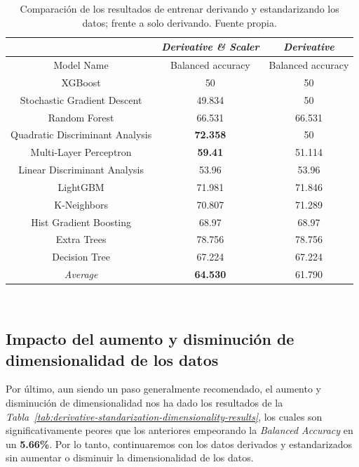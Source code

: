 \begin{table}[!h]
    \centering
    \begin{tabular}{|c|c|c|}
        \hline
        & \textit{Derivative \& Scaler} & \textit{Derivative} \\ \hline
        Model Name & Balanced accuracy & Balanced accuracy \\ \hline
        XGBoost & 50 & 50 \\
        Stochastic Gradient Descent & 49.834 & 50 \\ 
        Random Forest & 66.531 & 66.531 \\ 
        Quadratic Discriminant Analysis & \textbf{72.358} & 50 \\ 
        Multi-Layer Perceptron & \textbf{59.41} & 51.114 \\ 
        Linear Discriminant Analysis & 53.96 & 53.96 \\ 
        LightGBM & 71.981 & 71.846 \\ 
        K-Neighbors & 70.807 & 71.289 \\ 
        Hist Gradient Boosting & 68.97 & 68.97 \\ 
        Extra Trees & 78.756 & 78.756 \\ 
        Decision Tree & 67.224 & 67.224 \\ \hline
        \textit{Average} & \textbf{64.530} & 61.790 \\ \hline
    \end{tabular}
    \caption{Comparación de los resultados de entrenar derivando y estandarizando los datos; frente a solo derivando. Fuente propia.}\ \label{tab:derivative-standarization-results}
\end{table}


\subsection{Impacto del aumento y disminución de dimensionalidad de los datos}


Por último, aun siendo un paso generalmente recomendado, el aumento y disminución de dimensionalidad nos ha dado los resultados de la \textit{Tabla\ \ref{tab:derivative-standarization-dimensionality-results}}, los cuales son significativamente peores que los anteriores empeorando la \textit{Balanced Accuracy} en un \textbf{5.66\%}. Por lo tanto, continuaremos con los datos derivados y estandarizados sin aumentar o disminuir la dimensionalidad de los datos.

